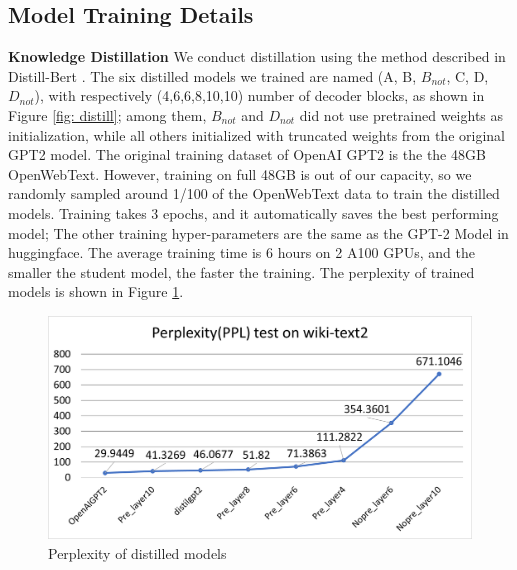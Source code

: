 \subsection{Model Training Details}

\noindent \textbf{Knowledge Distillation} \quad We conduct distillation using the method described in Distill-Bert \cite{Sanh2019DistilBERTAD}. The six distilled models we trained are named (A, B, $B_{not}$, C, D, $D_{not}$), with respectively (4,6,6,8,10,10) number of decoder blocks, as shown in Figure \ref{fig: distill}; among them, $B_{not}$ and $D_{not}$ did not use pretrained weights as initialization, while all others initialized with truncated weights from the original GPT2 model. The original training dataset of OpenAI GPT2 is the the 48GB OpenWebText. However, training on full 48GB is out of our capacity, so we randomly sampled around 1/100 of the OpenWebText data to train the distilled models. Training takes 3 epochs, and it automatically saves the best performing model; The other training hyper-parameters are the same as the GPT-2 Model in huggingface. The average training time is 6 hours on 2 A100 GPUs, and the smaller the student model, the faster the training. The perplexity of trained models is shown in Figure \ref{fig: ppl}.\\

\begin{figure}[ht]
\includegraphics[scale = 0.4]{graphs/distill_ppl.png}
\caption{Perplexity of distilled models}
\centering
\label{fig: ppl}
\end{figure}


